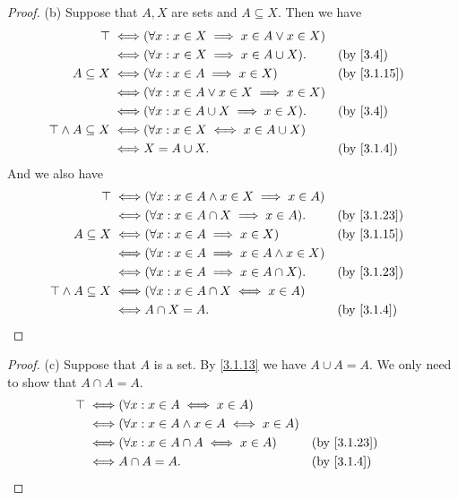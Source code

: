 \begin{proof}{(b)}
  Suppose that \(A, X\) are sets and \(A \subseteq X\).
  Then we have
  \begin{align*}
    \top \iff                     & (\forall x : x \in X \implies x \in A \lor x \in X)                  \\
    \iff                          & (\forall x : x \in X \implies x \in A \cup X).      &  & \by{3.4}    \\
    A \subseteq X \iff            & (\forall x : x \in A \implies x \in X)              &  & \by{3.1.15} \\
    \iff                          & (\forall x : x \in A \lor x \in X \implies x \in X)                  \\
    \iff                          & (\forall x : x \in A \cup X \implies x \in X).      &  & \by{3.4}    \\
    \top \land A \subseteq X \iff & (\forall x : x \in X \iff x \in A \cup X)                            \\
    \iff                          & X = A \cup X.                                       &  & \by{3.1.4}
  \end{align*}
  And we also have
  \begin{align*}
    \top \iff                     & (\forall x : x \in A \land x \in X \implies x \in A)                  \\
    \iff                          & (\forall x : x \in A \cap X \implies x \in A).       &  & \by{3.1.23} \\
    A \subseteq X \iff            & (\forall x : x \in A \implies x \in X)               &  & \by{3.1.15} \\
    \iff                          & (\forall x : x \in A \implies x \in A \land x \in X)                  \\
    \iff                          & (\forall x : x \in A \implies x \in A \cap X).       &  & \by{3.1.23} \\
    \top \land A \subseteq X \iff & (\forall x : x \in A \cap X \iff x \in A)                             \\
    \iff                          & A \cap X = A.                                        &  & \by{3.1.4}
  \end{align*}
\end{proof}

\begin{proof}{(c)}
  Suppose that \(A\) is a set.
  By \cref{3.1.13} we have \(A \cup A = A\).
  We only need to show that \(A \cap A = A\).
  \begin{align*}
    \top \iff & (\forall x : x \in A \iff x \in A)                                \\
    \iff      & (\forall x : x \in A \land x \in A \iff x \in A)                  \\
    \iff      & (\forall x : x \in A \cap A \iff x \in A)        &  & \by{3.1.23} \\
    \iff      & A \cap A = A.                                    &  & \by{3.1.4}
  \end{align*}
\end{proof}

